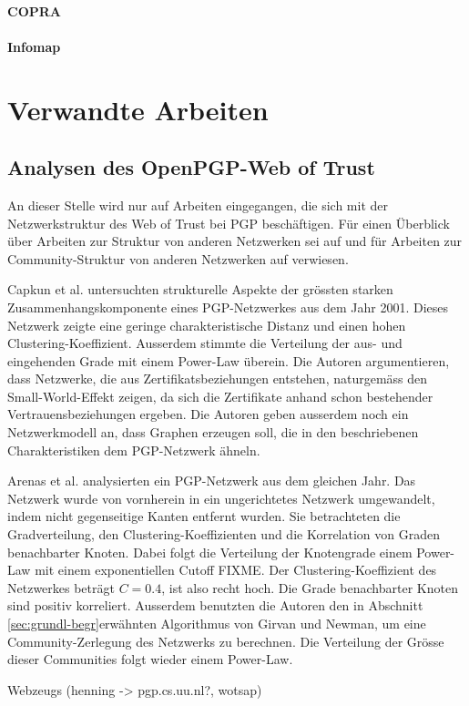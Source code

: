 \paragraph{COPRA}
\label{sec:copra}

\paragraph{Infomap}
\label{sec:infomap}

\section{Verwandte Arbeiten}
\label{ch:Grundlagen:sec:RelatedWork}

\subsection{Analysen des OpenPGP-Web of Trust}
\label{ch:Grundlagen:sec:RelatedWork:subsec:wot-analysis}

An dieser Stelle wird nur auf Arbeiten eingegangen, die sich mit der
Netzwerkstruktur des Web of Trust bei PGP besch\"aftigen. F\"ur einen
\"Uberblick \"uber Arbeiten zur Struktur von anderen Netzwerken sei
auf \cite{newman:167}und f\"ur Arbeiten zur Community-Struktur von
anderen Netzwerken auf \cite{Fortunato2010} verwiesen.

Capkun et al. \cite{Capkun2002} untersuchten strukturelle Aspekte der
gr\"ossten starken Zusammenhangskomponente eines PGP-Netzwerkes aus
dem Jahr 2001. Dieses Netzwerk zeigte eine geringe charakteristische
Distanz und einen hohen Clustering-Koeffizient. Ausserdem stimmte die
Verteilung der aus- und eingehenden Grade mit einem Power-Law
\"uberein. Die Autoren argumentieren, dass Netzwerke, die aus
Zertifikatsbeziehungen entstehen, naturgem\"ass den Small-World-Effekt
zeigen, da sich die Zertifikate anhand schon bestehender
Vertrauensbeziehungen ergeben. Die Autoren geben ausserdem noch ein
Netzwerkmodell an, dass Graphen erzeugen soll, die in den
beschriebenen Charakteristiken dem PGP-Netzwerk \"ahneln.

Arenas et al. \cite{Boguna2004} analysierten ein PGP-Netzwerk aus dem
gleichen Jahr. Das Netzwerk wurde von vornherein in ein ungerichtetes
Netzwerk umgewandelt, indem nicht gegenseitige Kanten entfernt
wurden. Sie betrachteten die Gradverteilung, den
Clustering-Koeffizienten und die Korrelation von Graden benachbarter
Knoten. Dabei folgt die Verteilung der Knotengrade einem Power-Law mit
einem exponentiellen Cutoff FIXME. Der Clustering-Koeffizient des
Netzwerkes betr\"agt $C=0.4$, ist also recht hoch. Die Grade
benachbarter Knoten sind positiv korreliert. Ausserdem benutzten die
Autoren den in Abschnitt \ref{sec:grundl-begr}erw\"ahnten Algorithmus
von Girvan und Newman, um eine Community-Zerlegung des Netzwerks zu
berechnen. Die Verteilung der Gr\"osse dieser Communities folgt wieder
einem Power-Law.

Webzeugs (henning -> pgp.cs.uu.nl?, wotsap)

